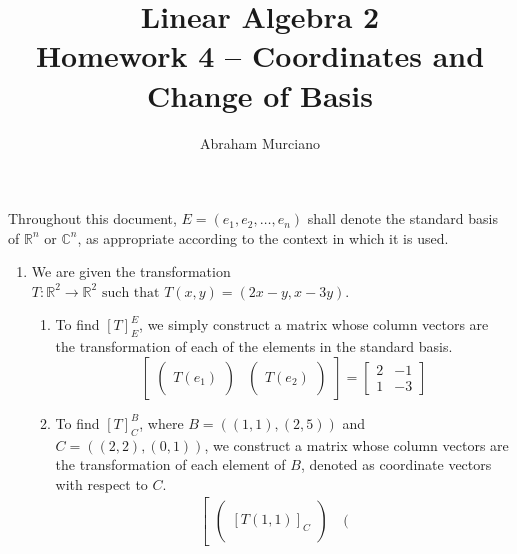 \documentclass{article}
\title{Linear Algebra 2 \\
\medskip
\large Homework 4 -- Coordinates and Change of Basis}
\author{Abraham Murciano}
\newenvironment{answers}{ %
	\begin{enumerate}
		\setlength{\itemsep}{\bigskipamount}
}{\end{enumerate}}
\newcommand{\R}{\mathbb{R}}
\newcommand{\C}{\mathbb{C}}
\newcommand{\st}{\text{ such that }}
\begin{document}
\maketitle

Throughout this document, \(E = (e_1, e_2, \dots, e_n)\) shall denote the standard basis of \(\R^n\) or \(\C^n\), as appropriate according to the context in which it is used.

\begin{answers}

	\item
		We are given the transformation \(T : \R^2 \to \R^2 \st T(x,y) = (2x-y, x-3y)\).

		\begin{enumerate}
			\item
				To find \([T]^E_E\), we simply construct a matrix whose column vectors are the transformation of each of the elements in the standard basis.
				\begin{equation*}
					\left[ \begin{matrix}
							\left( \begin{matrix}
								{} \\ T(e_1) \\ {}
							\end{matrix} \right) &
							\left( \begin{matrix}
								{} \\ T(e_2) \\ {}
							\end{matrix} \right)
						\end{matrix} \right]
					= \left[ \begin{matrix}
							2 & -1 \\
							1 & -3
						\end{matrix} \right]
				\end{equation*}
			\item
				To find \([T]^B_C\), where \(B = ((1,1), (2,5))\) and \(C=((2,2), (0,1))\), we construct a matrix whose column vectors are the transformation of each element of \(B\), denoted as coordinate vectors with respect to \(C\).
				\begin{gather*}
					\left[ \begin{matrix}
							\left( \begin{matrix}
								{} \\ [T(1,1)]_C \\ {}
							\end{matrix} \right) &
							\left( \begin{matrix}

\end{matrix}
\end{matrix}
\end{gather*}
\end{enumerate}
\end{answers}
\end{document}
